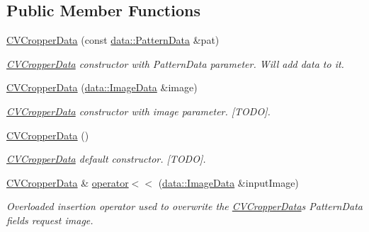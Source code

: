 \subsection*{Public Member Functions}
\begin{DoxyCompactItemize}
\item 
\hyperlink{classfilter_1_1algos_1_1_cropper_1_1_c_v_cropper_data_a8f2195d489fd541b9add781355bc99c2}{C\+V\+Cropper\+Data} (const \hyperlink{classfilter_1_1data_1_1_pattern_data}{data\+::\+Pattern\+Data} \&pat)
\begin{DoxyCompactList}\small\item\em \hyperlink{classfilter_1_1algos_1_1_cropper_1_1_c_v_cropper_data}{C\+V\+Cropper\+Data} constructor with Pattern\+Data parameter. Will add data to it. \end{DoxyCompactList}\item 
\hyperlink{classfilter_1_1algos_1_1_cropper_1_1_c_v_cropper_data_ad0dc18f5cb03ab6abcaa4dfea9594ae6}{C\+V\+Cropper\+Data} (\hyperlink{classfilter_1_1data_1_1_image_data}{data\+::\+Image\+Data} \&image)
\begin{DoxyCompactList}\small\item\em \hyperlink{classfilter_1_1algos_1_1_cropper_1_1_c_v_cropper_data}{C\+V\+Cropper\+Data} constructor with image parameter. \mbox{[}T\+O\+DO\mbox{]}. \end{DoxyCompactList}\item 
\mbox{\label{classfilter_1_1algos_1_1_cropper_1_1_c_v_cropper_data_a0ab57924d1fb875cd180416d7616e33e}} 
\hyperlink{classfilter_1_1algos_1_1_cropper_1_1_c_v_cropper_data_a0ab57924d1fb875cd180416d7616e33e}{C\+V\+Cropper\+Data} ()
\begin{DoxyCompactList}\small\item\em \hyperlink{classfilter_1_1algos_1_1_cropper_1_1_c_v_cropper_data}{C\+V\+Cropper\+Data} default constructor. \mbox{[}T\+O\+DO\mbox{]}. \end{DoxyCompactList}\item 
\hyperlink{classfilter_1_1algos_1_1_cropper_1_1_c_v_cropper_data}{C\+V\+Cropper\+Data} \& \hyperlink{classfilter_1_1algos_1_1_cropper_1_1_c_v_cropper_data_a8f551ce95e4cea54230ddbbd5b1cc6db}{operator$<$$<$} (\hyperlink{classfilter_1_1data_1_1_image_data}{data\+::\+Image\+Data} \&input\+Image)
\begin{DoxyCompactList}\small\item\em Overloaded insertion operator used to overwrite the \hyperlink{classfilter_1_1algos_1_1_cropper_1_1_c_v_cropper_data}{C\+V\+Cropper\+Data}\textquotesingle{}s Pattern\+Data field\textquotesingle{}s request image. \end{DoxyCompactList}\item 

\end{DoxyCompactItemize}
